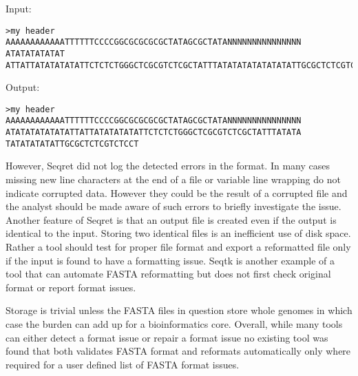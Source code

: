 Input:

\begin{verbatim}
>my header
AAAAAAAAAAAATTTTTTCCCCGGCGCGCGCGCTATAGCGCTATANNNNNNNNNNNNNNN
ATATATATATAT
ATTATTATATATATATTCTCTCTGGGCTCGCGTCTCGCTATTTATATATATATATATATTGCGCTCTCGTCTCCT\end{verbatim}

Output:

\begin{verbatim}
>my header
AAAAAAAAAAAATTTTTTCCCCGGCGCGCGCGCTATAGCGCTATANNNNNNNNNNNNNNN
ATATATATATATATTATTATATATATATTCTCTCTGGGCTCGCGTCTCGCTATTTATATA
TATATATATATTGCGCTCTCGTCTCCT
\end{verbatim}

However, Seqret did not log the detected errors in the format. In many cases missing new line characters at the end of a file or variable line wrapping do not indicate corrupted data. However they could be the result of a corrupted file and the analyst should be made aware of such errors to briefly investigate the issue. Another feature of Seqret is that an output file is created even if the output is identical to the input. Storing two identical files is an inefficient use of disk space. Rather a tool should test for proper file format and export a reformatted file only if the input is found to have a formatting issue. Seqtk is another example of a tool that can automate FASTA reformatting but does not first check original format or report format issues. 

Storage is trivial unless the FASTA files in question store whole genomes in which case the burden can add up for a bioinformatics core. Overall, while many tools can either detect a format issue or repair a format issue no existing tool was found that both validates FASTA format and reformats automatically only where required for a user defined list of FASTA format issues.

  
  
  
  
  
  
  
  
  
  
  
  
  
  
  
  
  
  
  
  
  
  
  
  
  
  
  
  